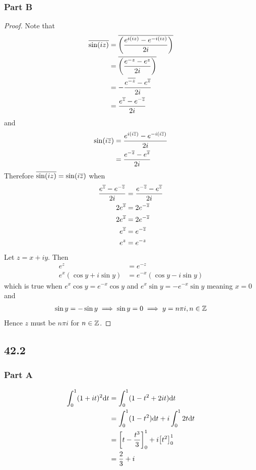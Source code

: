 \documentclass[12pt,titlepage]{extarticle}
\begin{document}
\subsubsection*{Part B}
\begin{proof}
    Note that
    \begin{align*}
        \overline{\sin(iz)} &= \overline{\qty(\frac{e^{i(iz)} - e^{-i(iz)}}{2i})} \\
                        &= \overline{\qty(\frac{e^{-z} - e^z}{2i})} \\
                        &= -\frac{e^{\overline{-z}} - e^{\overline{z}}}{2i} \\
                        &= \frac{e^{\overline{z}} - e^{-\overline{z}}}{2i}
    \end{align*}
    and
    \begin{align*}
        \sin(i \overline{z}) &= \frac{e^{i (i \overline{z})} - e^{-i (i \overline{z})}}{2i} \\
                         &= \frac{e^{-\overline{z}} - e^{\overline{z}}}{2i}
    \end{align*}
    Therefore $\overline{\sin(iz)} = \sin(i \overline{z})$ when
    \begin{align*}
        \frac{e^{\overline{z}} - e^{-\overline{z}}}{2i} &= \frac{e^{-\overline{z}} - e^{\overline{z}}}{2i} \\
        2e^{\overline{z}} &= 2e^{-\overline{z}} \\
        2e^{\overline{z}} &= 2e^{-\overline{z}} \\
        e^{\overline{z}} &= e^{-\overline{z}} \\
        e^{z} &= e^{-z}
    \end{align*}
    Let $z = x + iy$. Then
    \begin{align*}
        e^z &= e^{-z} \\
        e^x (\cos y + i \sin y) &= e^{-x} (\cos y - i \sin y)
    \end{align*}
    which is true when $e^x \cos y = e^{-x} \cos y$ and $e^x \sin y = -e^{-x} \sin y$ meaning $x = 0$ and
    \begin{align*}
        \sin y = - \sin y \implies \sin y = 0 \implies y = n \pi i, n \in \mathbb{Z}
    \end{align*}
    Hence $z$ must be $n \pi i$ for $n \in \mathbb{Z}$.
\end{proof}

\subsection*{42.2}
\subsubsection*{Part A}
\begin{align*}
    \int_0^1 (1 + it)^2 \dd t &= \int_0^1 (1 - t^2 + 2it) \dd t \\
    &= \int_0^1 (1-t^2) \dd t + i \int_0^1 2t \dd t \\
    &= \qty[t - \frac{t^3}{3}]_0^1 + i \qty[t^2]_0^1 \\
    &= \frac{2}{3} + i
\end{align*}
\end{document}
